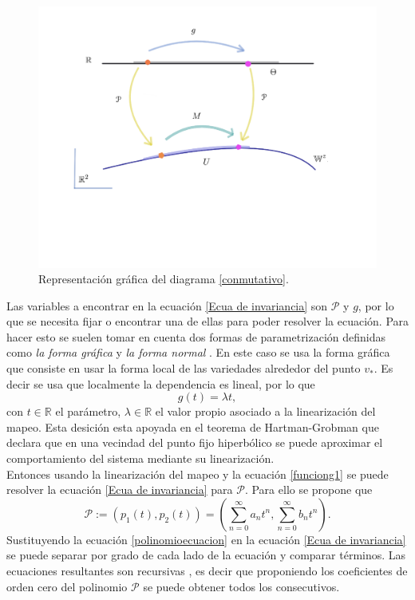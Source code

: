 \begin{figure}[h!]
	\centering
	\includegraphics[scale=0.4]{diagrama2}
	\caption{Representación gr\'afica del diagrama \eqref{conmutativo}.}
	\label{diagrama-conmutativo}
\end{figure}

Las variables a encontrar en la ecuaci\'on \ref{Ecua de invariancia} son $\mathcal{P}$ y $g$, por lo que se necesita fijar o encontrar una de ellas para poder resolver la ecuaci\'on. Para hacer esto se suelen tomar en cuenta dos formas de parametrizaci\'on definidas como \textit{la forma gr\'afica} y \textit{la forma normal} \cite{Haro}. En este caso se usa la forma gr\'afica que consiste en usar la forma local de las variedades alrededor del punto $v_{*}$. Es decir se usa que localmente la dependencia es lineal, por lo que 
\begin{equation}
g(t) = \lambda t,
\label{funciong1}
\end{equation}
con $t\in \mathbb{R}$ el par\'ametro, $\lambda\in \mathbb{R}$ el valor propio asociado a la linearizaci\'on del mapeo. Esta desici\'on esta apoyada en el teorema de Hartman-Grobman \cite{devaney}\cite{Juergen}  que declara que en una vecindad del punto fijo hiperb\'olico se puede aproximar el comportamiento del sistema mediante su linearizaci\'on. \\

Entonces usando la linearizaci\'on del mapeo y la ecuaci\'on \eqref{funciong1} se puede resolver la ecuaci\'on \eqref{Ecua de invariancia} para $\mathcal{P}$. Para ello se propone que 
\begin{equation}
\mathcal{P} := (p_{1}(t), p_{2}(t)) =( \sum_{n=0}^{\infty}a_{n}t^{n}, \sum_{n=0}^{\infty}b_{n}t^{n}).
\label{polinomioecuacion}
\end{equation}
Sustituyendo la ecuaci\'on \eqref{polinomioecuacion} en la ecuaci\'on \eqref{Ecua de invariancia} se puede separar por grado de cada lado de la ecuaci\'on y comparar t\'erminos.  Las ecuaciones resultantes son recursivas , es decir que proponiendo los coeficientes de orden cero del polinomio $\mathcal{P}$ se puede obtener todos los consecutivos. 


